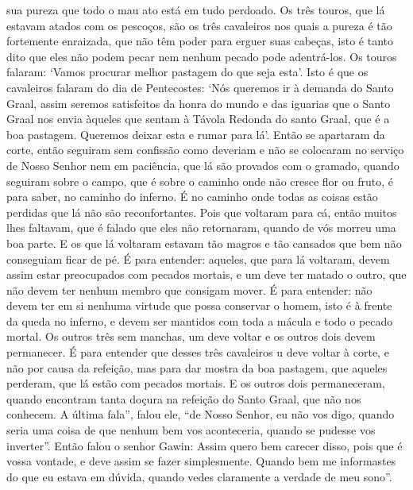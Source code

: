 sua pureza que todo o mau ato está em tudo perdoado. Os três touros, que lá
estavam atados com os pescoços, são os três cavaleiros nos quais a pureza é tão
fortemente enraizada, que não têm poder para erguer suas cabeças, isto é tanto
dito que eles não podem pecar nem nenhum pecado pode adentrá-los. Os touros
falaram: ‘Vamos procurar melhor pastagem do que seja esta’. Isto é que os
cavaleiros falaram do dia de Pentecostes: ‘Nós queremos ir à demanda do Santo
Graal, assim seremos satisfeitos da honra do mundo e das iguarias que o Santo
Graal nos envia àqueles que sentam à Távola Redonda do santo Graal, que é a boa
pastagem. Queremos deixar esta e rumar para lá’. Então se apartaram da corte,
então seguiram sem confissão como deveriam e não se colocaram no serviço de
Nosso Senhor nem em paciência, que lá são provados com o gramado, quando
seguiram sobre o campo, que é sobre o caminho onde não cresce flor ou fruto, é
para saber, no caminho do inferno. É no caminho onde todas as coisas estão
perdidas que lá não são reconfortantes. Pois que voltaram para cá, então muitos
lhes faltavam, que é falado que eles não retornaram, quando de vós morreu uma
boa parte. E os que lá voltaram estavam tão magros e tão cansados que bem não
conseguiam ficar de pé. É para entender: aqueles, que para lá voltaram, devem
assim estar preocupados com pecados mortais, e um deve ter matado o outro, que
não devem ter nenhum membro que consigam mover. É para entender: não devem ter
em si nenhuma virtude que possa conservar o homem, isto é à frente da queda no
inferno, e devem ser mantidos com toda a mácula e todo o pecado mortal. Os
outros três sem manchas, um deve voltar e os outros dois devem permanecer. É
para entender que desses três cavaleiros u deve voltar à corte, e não por causa
da refeição, mas para dar mostra da boa pastagem, que aqueles perderam, que lá
estão com pecados mortais. E os outros dois permaneceram, quando encontram
tanta doçura na refeição do Santo Graal, que não nos conhecem. A última fala”,
falou ele, “de Nosso Senhor,  eu não vos digo, quando seria uma coisa de que
nenhum bem vos aconteceria, quando se pudesse vos inverter”. Então falou o
senhor Gawin: Assim quero bem carecer disso, pois que é vossa vontade, e deve
assim se fazer simplesmente. Quando bem me informastes do que eu estava em
dúvida, quando vedes claramente a verdade de meu sono”. 

